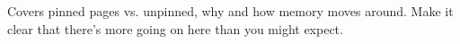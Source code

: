 Covers pinned pages vs. unpinned, why and how memory moves around. Make it clear
that there's more going on here than you might expect.\\
